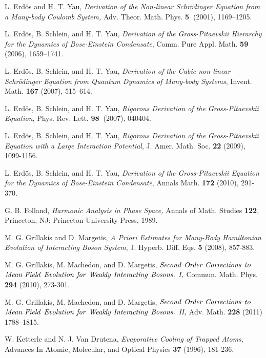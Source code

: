 \documentclass[reqno]{amsart}
\theoremstyle{plain}
\numberwithin{equation}{section}
\begin{document}
\begin{thebibliography}{99}
 L. Erd\"{o}s and H. T. Yau, \emph{Derivation of the
Non-linear Schr\"{o}dinger Equation from a Many-body Coulomb System,} Adv.
Theor. Math. Phys. \textbf{5\ }(2001), 1169--1205.

 L. Erd\"{o}s, B. Schlein, and H. T. Yau, \emph{Derivation
of the Gross-Pitaevskii Hierarchy for the Dynamics of Bose-Einstein
Condensate}, Comm. Pure Appl. Math. \textbf{59} (2006), 1659--1741.

 L. Erd\"{o}s, B. Schlein, and H. T. Yau, \emph{Derivation
of the Cubic non-linear Schr\"{o}dinger Equation from Quantum Dynamics of
Many-body Systems}, Invent. Math. \textbf{167} (2007), 515--614.

 L. Erd\"{o}s, B. Schlein, and H. T. Yau, \emph{Rigorous
Derivation of the Gross-Pitaevskii Equation}, Phys. Rev. Lett. \textbf{98\ }(2007), 040404.

 L. Erd\"{o}s, B. Schlein, and H. T. Yau, \emph{Rigorous
Derivation of the Gross-Pitaevskii Equation with a Large Interaction
Potential}, J. Amer. Math. Soc. \textbf{22} (2009), 1099-1156.

 L. Erd\"{o}s, B. Schlein, and H. T. Yau, \emph{Derivation
of the Gross-Pitaevskii Equation for the Dynamics of Bose-Einstein Condensate}, Annals Math. \textbf{172} (2010), 291-370.

 G. B. Folland, \emph{Harmonic Analysis in Phase Space}\textit{,} Annals of Math. Studies \textbf{122}, Princeton, NJ: Princeton
University Press, 1989.

 M. G. Grillakis and D. Margetis, \emph{A Priori Estimates for
Many-Body Hamiltonian Evolution of Interacting Boson System}, J. Hyperb.
Diff. Eqs. \textbf{5} (2008), 857-883.

 M. G. Grillakis, M. Machedon, and D. Margetis, $\emph{Second}$
$\emph{Order}$ $\emph{Corrections}$ $\emph{to}$ $\emph{Mean}$ $\emph{Field}$ 
$\emph{Evolution}$ $\emph{for}$ $\emph{Weakly}$ $\emph{Interacting}$ $\emph{Bosons.}$ $\emph{I,}$ Commun. Math. Phys. \textbf{294} (2010), 273-301.

 M. G. Grillakis, M. Machedon, and D. Margetis, $\emph{Second}$
$\emph{Order}$ $\emph{Corrections}$ $\emph{to}$ $\emph{Mean}$ $\emph{Field}$ 
$\emph{Evolution}$ $\emph{for}$ $\emph{Weakly}$ $\emph{Interacting}$ $\emph{Bosons.}$ $\emph{II,}$ Adv. Math. \textbf{228} (2011) 1788--1815.

 W. Ketterle and N. J. Van Drutena, \emph{Evaporative
Cooling of Trapped Atoms, }Advances In Atomic, Molecular, and Optical
Physics \textbf{37} (1996), 181-236.


\end{thebibliography}
\end{document}
